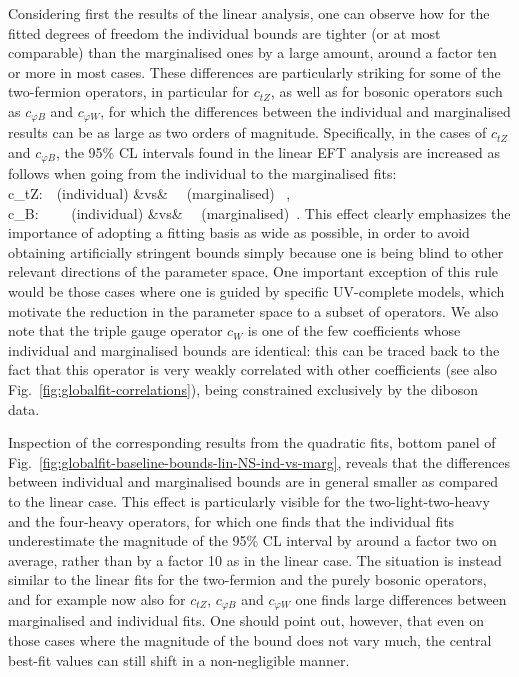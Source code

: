 Considering first the results of the linear analysis,
one can observe how for the fitted degrees of freedom the individual bounds are tighter
(or at most comparable) than the marginalised
ones by a large amount, around a factor ten or more in most cases.
%
These differences are particularly striking for some of the two-fermion operators,
in particular for $c_{tZ}$, as well as for bosonic operators such as
$c_{\varphi B}$ and $c_{\varphi W}$,
for which the differences between the individual and marginalised results can be as large
as two orders of magnitude.
%
Specifically, in the cases of $c_{tZ}$ and $c_{\varphi B}$, the 95\% CL intervals
found in the linear EFT analysis are
increased as follows when going from the individual to the marginalised fits:
\bea
\nonumber
c_{tZ}:\qquad [-0.04,0.10]~~{\rm (individual)}  \quad&{\rm vs}&         \quad [-17,5.6]~~{\rm (marginalised)} \, ,\\
c_{\varphi B}:~~ \quad [-0.005,0.002] ~~{\rm (individual)}  \quad&{\rm vs}&   \quad  [-0.7,0.3]~~{\rm (marginalised)}\, .
\nonumber
\eea
%
This effect clearly emphasizes the importance of adopting a fitting basis as wide as possible,
in order to avoid obtaining artificially stringent bounds simply because one is being
blind to other relevant directions of the parameter space.
%
One important exception of this rule would be those cases where one is guided by 
specific UV-complete models, which motivate the reduction in the parameter space
to a subset of operators.
%
We also note that the triple gauge operator $c_W$ is one of the few coefficients whose individual
and marginalised bounds are identical: this can be traced back
to the fact that this operator is very weakly correlated with
other coefficients (see also  Fig.~\ref{fig:globalfit-correlations}), being
constrained exclusively by the diboson data.

Inspection of the corresponding results
from the quadratic fits, bottom panel of Fig.~\ref{fig:globalfit-baseline-bounds-lin-NS-ind-vs-marg}, 
 reveals that the differences between individual and marginalised bounds are in general
smaller as compared to the linear case.
%
This effect is particularly visible
for the two-light-two-heavy and the four-heavy operators, for which one finds
that the individual fits underestimate the magnitude of the 95\% CL interval by around
a factor two on average, rather than by a factor 10 as in the linear case.
%
The situation is instead similar to the linear fits for the two-fermion and the purely
bosonic operators, and for example now also for  $c_{tZ}$, $c_{\varphi B}$ and $c_{\varphi W}$ one finds
large differences between marginalised and individual fits.
%
One should point out, however,
that even on those cases where the magnitude of the bound
does not vary much, the central best-fit values can still shift in a non-negligible manner.

